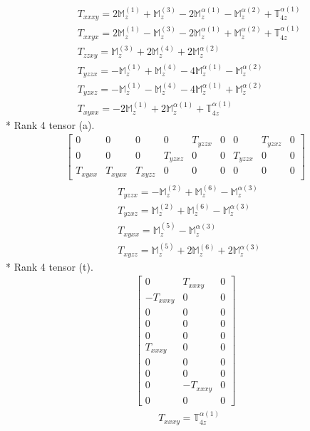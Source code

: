 \documentclass[fleqn,8pt,landscape]{jsarticle}
\begin{document}
\begin{align*}
& T_{xxxy} = 2 \mathbb{M}_{z}^{(1)} + \mathbb{M}_{z}^{(3)} - 2 \mathbb{M}_{z}^{\alpha(1)} - \mathbb{M}_{z}^{\alpha(2)} + \mathbb{T}_{4z}^{\alpha(1)} \\
& T_{xxyx} = 2 \mathbb{M}_{z}^{(1)} - \mathbb{M}_{z}^{(3)} - 2 \mathbb{M}_{z}^{\alpha(1)} + \mathbb{M}_{z}^{\alpha(2)} + \mathbb{T}_{4z}^{\alpha(1)} \\
& T_{zzxy} = \mathbb{M}_{z}^{(3)} + 2 \mathbb{M}_{z}^{(4)} + 2 \mathbb{M}_{z}^{\alpha(2)} \\
& T_{yzzx} = - \mathbb{M}_{z}^{(1)} + \mathbb{M}_{z}^{(4)} - 4 \mathbb{M}_{z}^{\alpha(1)} - \mathbb{M}_{z}^{\alpha(2)} \\
& T_{yzxz} = - \mathbb{M}_{z}^{(1)} - \mathbb{M}_{z}^{(4)} - 4 \mathbb{M}_{z}^{\alpha(1)} + \mathbb{M}_{z}^{\alpha(2)} \\
& T_{xyxx} = - 2 \mathbb{M}_{z}^{(1)} + 2 \mathbb{M}_{z}^{\alpha(1)} + \mathbb{T}_{4z}^{\alpha(1)}
\end{align*}
* Rank 4 tensor (a).
\begin{align*}
\begin{bmatrix} 0 & 0 & 0 & 0 & T_{yzzx} & 0 & 0 & T_{yzxz} & 0 \\ 0 & 0 & 0 & T_{yzxz} & 0 & 0 & T_{yzzx} & 0 & 0 \\ T_{xyxx} & T_{xyxx} & T_{xyzz} & 0 & 0 & 0 & 0 & 0 & 0 \end{bmatrix}
\end{align*}
\begin{align*}
& T_{yzzx} = - \mathbb{M}_{z}^{(2)} + \mathbb{M}_{z}^{(6)} - \mathbb{M}_{z}^{\alpha(3)} \\
& T_{yzxz} = \mathbb{M}_{z}^{(2)} + \mathbb{M}_{z}^{(6)} - \mathbb{M}_{z}^{\alpha(3)} \\
& T_{xyxx} = \mathbb{M}_{z}^{(5)} - \mathbb{M}_{z}^{\alpha(3)} \\
& T_{xyzz} = \mathbb{M}_{z}^{(5)} + 2 \mathbb{M}_{z}^{(6)} + 2 \mathbb{M}_{z}^{\alpha(3)}
\end{align*}
* Rank 4 tensor (t).
\begin{align*}
\begin{bmatrix} 0 & T_{xxxy} & 0 \\ - T_{xxxy} & 0 & 0 \\ 0 & 0 & 0 \\ 0 & 0 & 0 \\ 0 & 0 & 0 \\ T_{xxxy} & 0 & 0 \\ 0 & 0 & 0 \\ 0 & 0 & 0 \\ 0 & - T_{xxxy} & 0 \\ 0 & 0 & 0 \end{bmatrix}
\end{align*}
\begin{align*}
& T_{xxxy} = \mathbb{T}_{4z}^{\alpha(1)}
\end{align*}
\end{document}
